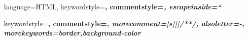 {
	language=HTML,
	keywordstyle=\color{blue}\bfseries,
	commentstyle=\color{gray}\itshape,
	escapeinside=``
}

{
	keywordstyle=\color{cssKeyword}\bfseries,
	commentstyle=\color{gray}\itshape,
	morecomment=[s][\color{gray}]{/*}{*/},
	alsoletter=-,
	morekeywords={border,background-color}
}

